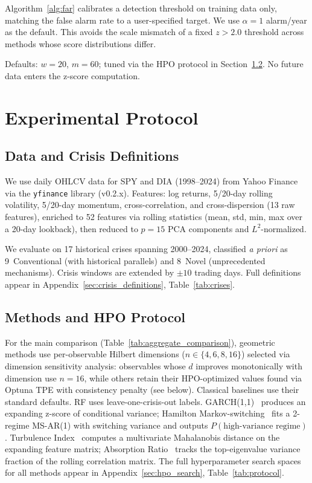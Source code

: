 \documentclass[3p]{elsarticle}
\begin{document}
\noindent Algorithm~\ref{alg:far} calibrates a detection threshold on
training data only, matching the false alarm rate to a user-specified
target.  We use $\alpha = 1$ alarm/year as the default.  This avoids
the scale mismatch of a fixed $z > 2.0$ threshold across methods
whose score distributions differ.

\noindent Defaults: $w = 20$, $m = 60$; tuned via the HPO protocol in
Section~\ref{subsec:methods_protocol}.  No future data enters the
z-score computation.

\section{Experimental Protocol}\label{sec:protocol}

\subsection{Data and Crisis Definitions}\label{subsec:data}

We use daily OHLCV data for SPY and DIA (1998--2024) from Yahoo Finance via the \texttt{yfinance} library (v0.2.x).
Features: log returns, 5/20-day rolling volatility, 5/20-day momentum,
cross-correlation, and cross-dispersion (13 raw features), enriched to
52 features via rolling statistics (mean, std, min, max over a
20-day lookback), then reduced to $p = 15$ PCA components and
$L^2$-normalized.

We evaluate on 17 historical crises spanning 2000--2024, classified
\emph{a priori} as 9~Conventional (with historical parallels) and
8~Novel (unprecedented mechanisms).  Crisis windows are extended by
$\pm 10$ trading days.  Full definitions appear in
Appendix~\ref{sec:crisis_definitions}, Table~\ref{tab:crises}.

\subsection{Methods and HPO Protocol}\label{subsec:methods_protocol}

For the main comparison (Table~\ref{tab:aggregate_comparison}),
geometric methods use per-observable Hilbert dimensions ($n \in \{4, 6, 8, 16\}$)
selected via dimension sensitivity analysis: observables whose $d$ improves
monotonically with dimension use $n = 16$, while others retain their
HPO-optimized values found via Optuna TPE with consistency penalty
(see below).  Classical baselines use
their standard defaults.  RF uses leave-one-crisis-out labels.
GARCH(1,1)~\cite{bollerslev1986} produces an expanding z-score of
conditional variance; Hamilton
Markov-switching~\cite{hamilton1989} fits a 2-regime MS-AR(1) with
switching variance and outputs $P(\text{high-variance regime})$.
Turbulence Index~\cite{chow1999} computes a multivariate Mahalanobis
distance on the expanding feature matrix; Absorption
Ratio~\cite{kritzman2011} tracks the top-eigenvalue variance fraction
of the rolling correlation matrix.
The full hyperparameter search spaces for all methods appear in
Appendix~\ref{sec:hpo_search}, Table~\ref{tab:protocol}.
\end{document}
